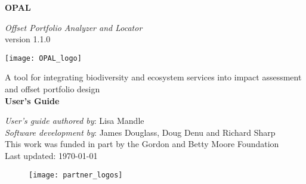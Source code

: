 \begin{titlepage}
    \begin{center}
        \vspace*{1cm}
        
        {\Huge \textbf{OPAL}}
        
        \vspace{0.5cm}
        {\Large \em Offset Portfolio Analyzer and Locator}\\
        {\large version 1.1.0 }%
        
        \vspace{0.75cm}
        \texttt{[image: OPAL\_logo]}
        \vspace{0.75cm}
        
        {\large A tool for integrating biodiversity and ecosystem services into impact assessment
        and offset portfolio design}\\
        \vspace{0.5cm}
        {\huge \textbf{User's Guide}}
      \end{center}        
        \vfill
        
        {\setlength{\parindent}{0cm}
        
        	{\em User’s guide authored by}: Lisa Mandle\\
        	{\em Software development by}: James Douglass, Doug Denu and Richard Sharp\\
        	
        	This work was funded in part by the Gordon and Betty Moore Foundation\\
        	
        	Last updated: \today
        	
        }
        

        \begin{figure}[b]
        	\texttt{[image: partner\_logos]}
        \end{figure}
      
\end{titlepage}